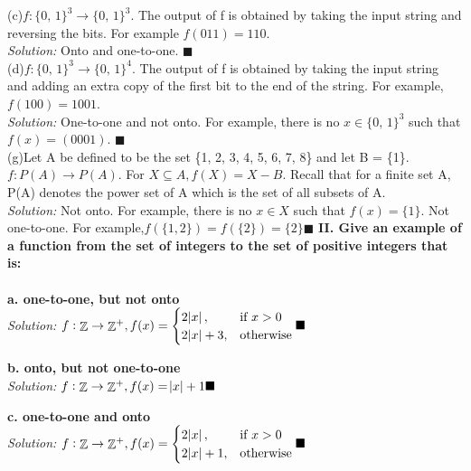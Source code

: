 \documentclass[11pt]{article}
\DeclareMathOperator*{\Z}{\mathbb{Z}}\relax
\begin{document}
		(c)$f: \{0, \, 1\}^3 \rightarrow \{0, \, 1\}^3$. The output of f is obtained by taking the input string and reversing the bits. For example $f(011) = 110$.\\
		\textit{Solution: }
		Onto and one-to-one. $\blacksquare$ \\
		
		(d)$f: \{0, \, 1\}^3 \rightarrow \{0, \, 1\}^4$. The output of f is obtained by taking the input string and adding an extra copy of the first bit to the end of the string. 
		For example, $f(100) = 1001$. \\
		\textit{Solution: }
		One-to-one and not onto. For example, there is no $x \in  \{0, \, 1\}^3$ such that $f(x) = (0001)$. $\blacksquare$ \\
		
		(g)Let A be defined to be the set \{1, 2, 3, 4, 5, 6, 7, 8\} and let B = \{1\}.
		$f: P(A) \rightarrow P(A)$. For $X \subseteq A, f(X) = X - B$. 
		Recall that for a finite set A, P(A) denotes the power set of A which is the set of all subsets of A. \\
		\textit{Solution: }
		Not onto. For example, there is no $x \in  X$ such that $f(x) = \{1\}$. 
		Not one-to-one. For example,$f(\{1, 2\}) = f(\{2\}) = \{2\}\blacksquare$ 
	\newpage
	\textbf{II. Give an example of a function from the set of integers to the set of positive integers that is:}\\
	\\	
		\textbf{a. one-to-one, but not onto} \\
		\textit{Solution: }
		$f: \Z \rightarrow \Z^+, f(x) = 
							\begin{cases}
   								 2\abs{x} , & \text{if } x > 0\\
    								2\abs{x}  + 3,              & \text{otherwise}
							\end{cases} \blacksquare$		
		
		\textbf{b. onto, but not one-to-one} \\
		\textit{Solution: }
		$f: \Z \rightarrow \Z^+, f(x) = \abs{x} + 1 \blacksquare$
		
		\textbf{c. one-to-one and onto} \\
		\textit{Solution: }
		$f: \Z \rightarrow \Z^+, f(x) = 
							\begin{cases}
   								 2\abs{x} , & \text{if } x > 0\\
    								2\abs{x}  + 1,              & \text{otherwise}
							\end{cases} \blacksquare$ \\	
		
\end{document}
